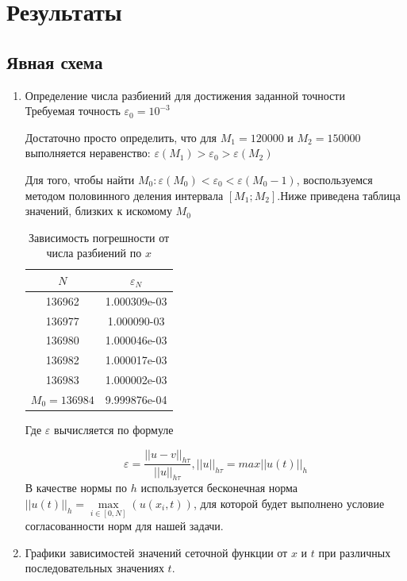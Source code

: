 \documentclass[12pt]{article}
\begin{document}
\section{Результаты}
\subsection{Явная схема}
\begin{enumerate}
\item Определение числа разбиений для достижения заданной точности \\
Требуемая точность $\varepsilon_0 = 10^{-3}$

Достаточно просто определить, что для $M_1 = 120000$ и $M_2 = 150000$ выполняется неравенство: $\varepsilon(M_1) > \varepsilon_0 > \varepsilon(M_2)$

Для того, чтобы найти $M_0: \varepsilon(M_0) < \varepsilon_0 < \varepsilon(M_0 - 1)$, воспользуемся методом половинного деления интервала $[M_1;M_2]$.Ниже приведена таблица значений, близких к искомому $M_0$

\begin{table}[H]
\caption{Зависимость погрешности от числа разбиений по $x$ }
\begin{center}
\begin{tabular}{|c|c|}
\hline
$N$ & $\varepsilon_N$ \\
\hline
136962 & 1.000309e-03 \\
\hline
136977 & 1.000090-03  \\
\hline
136980 & 1.000046e-03 \\
\hline
136982 & 1.000017e-03 \\
\hline
136983 & 1.000002e-03 \\
\hline
$M_0 = 136984$ & 9.999876e-04 \\
\hline
\end{tabular}
\end{center}
\end{table}

Где $\varepsilon$ вычисляется по формуле

$$
\varepsilon = \dfrac{||u -v||_{h\tau}}{||u||_{h\tau}},  ||u||_{h\tau} = max||u(t)||_h
$$
В качестве нормы по $h$ используется бесконечная норма $||u(t)||_h = \max \limits_{{i\in[0,N]}}(u(x_i, t))$, 
для которой будет выполнено условие согласованности норм для нашей задачи.

\newpage

\item Графики зависимостей значений сеточной функции от $x$ и $t$ при различных последовательных значениях $t$.


\end{enumerate}
\end{document}

